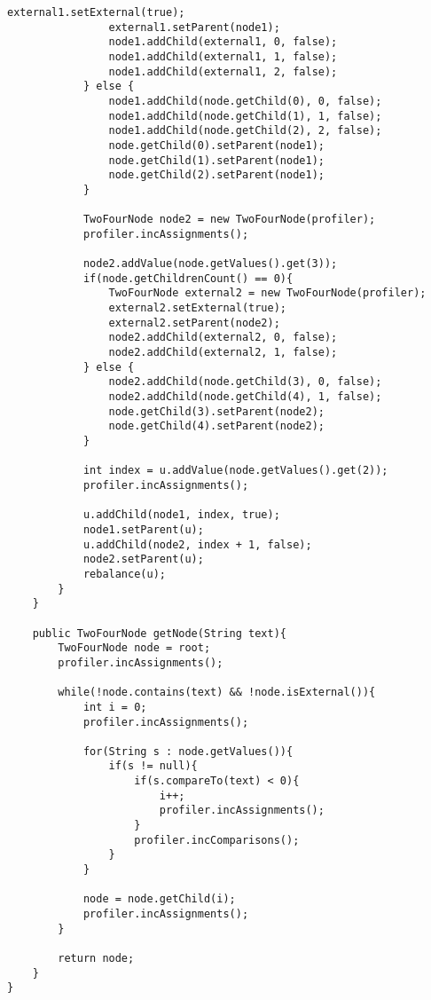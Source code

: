 \begin{lstlisting}[caption=TwoFourTree classes Source code - TwoFourTree]
				external1.setExternal(true);
				external1.setParent(node1);
				node1.addChild(external1, 0, false);
				node1.addChild(external1, 1, false);
				node1.addChild(external1, 2, false);
			} else {
				node1.addChild(node.getChild(0), 0, false);
				node1.addChild(node.getChild(1), 1, false);
				node1.addChild(node.getChild(2), 2, false);
				node.getChild(0).setParent(node1);
				node.getChild(1).setParent(node1);
				node.getChild(2).setParent(node1);
			}
			
			TwoFourNode node2 = new TwoFourNode(profiler);
			profiler.incAssignments();
			
			node2.addValue(node.getValues().get(3));
			if(node.getChildrenCount() == 0){
				TwoFourNode external2 = new TwoFourNode(profiler);
				external2.setExternal(true);
				external2.setParent(node2);
				node2.addChild(external2, 0, false);
				node2.addChild(external2, 1, false);
			} else {
				node2.addChild(node.getChild(3), 0, false);
				node2.addChild(node.getChild(4), 1, false);
				node.getChild(3).setParent(node2);
				node.getChild(4).setParent(node2);
			}

			int index = u.addValue(node.getValues().get(2));
			profiler.incAssignments();
			
			u.addChild(node1, index, true);
			node1.setParent(u);
			u.addChild(node2, index + 1, false);
			node2.setParent(u);
			rebalance(u);			
		}
	}
	
	public TwoFourNode getNode(String text){
		TwoFourNode node = root;
		profiler.incAssignments();
		
		while(!node.contains(text) && !node.isExternal()){
			int i = 0;
			profiler.incAssignments();
			
			for(String s : node.getValues()){
				if(s != null){
					if(s.compareTo(text) < 0){
						i++;
						profiler.incAssignments();
					}
					profiler.incComparisons();
				}
			}
			
			node = node.getChild(i);
			profiler.incAssignments();
		}
		
		return node;
	}
}
\end{lstlisting}

